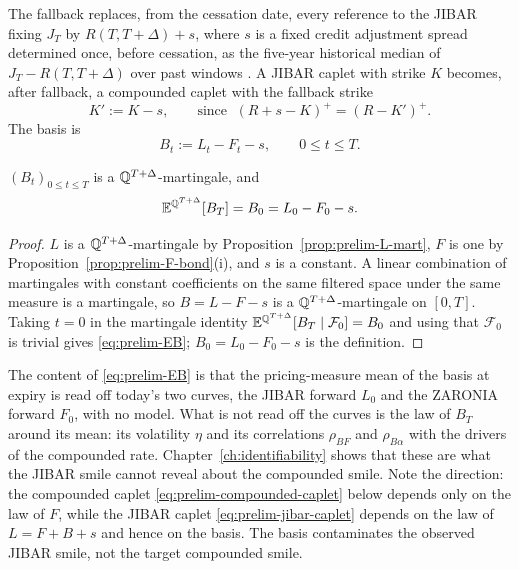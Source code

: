 \documentclass[../../../main.tex]{subfiles}
\begin{document}
\begin{definition}\label{def:prelim-fallback}
The fallback replaces, from the cessation date, every reference to the JIBAR fixing $J_T$ by $R(T,T+\Delta)+s$, where $s$ is a fixed credit adjustment spread determined once, before cessation, as the five-year historical median of $J_T-R(T,T+\Delta)$ over past windows \cite{sarb2025fallback,isda2025}. A JIBAR caplet with strike $K$ becomes, after fallback, a compounded caplet with the fallback strike
\[
K':=K-s,\qquad\text{since }\;(R+s-K)^+=(R-K')^+ .
\]
The basis is
\begin{equation}\label{eq:prelim-basis}
B_t:=L_t-F_t-s,\qquad 0\le t\le T .
\end{equation}
\end{definition}


\begin{proposition}\label{prop:prelim-B-mart}
$(B_t)_{0\le t\le T}$ is a $\mathbb{Q}^{T+\Delta}$-martingale, and
\begin{equation}\label{eq:prelim-EB}
\mathbb{E}^{\mathbb{Q}^{T+\Delta}}[B_T]=B_0=L_0-F_0-s .
\end{equation}
\end{proposition}

\begin{proof}
$L$ is a $\mathbb{Q}^{T+\Delta}$-martingale by Proposition~\ref{prop:prelim-L-mart}, $F$ is one by Proposition~\ref{prop:prelim-F-bond}(i), and $s$ is a constant. A linear combination of martingales with constant coefficients on the same filtered space under the same measure is a martingale, so $B=L-F-s$ is a $\mathbb{Q}^{T+\Delta}$-martingale on $[0,T]$. Taking $t=0$ in the martingale identity $\mathbb{E}^{\mathbb{Q}^{T+\Delta}}[B_T\mid\mathcal F_0]=B_0$ and using that $\mathcal F_0$ is trivial gives \eqref{eq:prelim-EB}; $B_0=L_0-F_0-s$ is the definition.
\end{proof}

The content of \eqref{eq:prelim-EB} is that the pricing-measure mean of the basis at expiry is read off today's two curves, the JIBAR forward $L_0$ and the ZARONIA forward $F_0$, with no model. What is not read off the curves is the law of $B_T$ around its mean: its volatility $\eta$ and its correlations $\rho_{BF}$ and $\rho_{B\alpha}$ with the drivers of the compounded rate. Chapter~\ref{ch:identifiability} shows that these are what the JIBAR smile cannot reveal about the compounded smile. Note the direction: the compounded caplet \eqref{eq:prelim-compounded-caplet} below depends only on the law of $F$, while the JIBAR caplet \eqref{eq:prelim-jibar-caplet} depends on the law of $L=F+B+s$ and hence on the basis. The basis contaminates the observed JIBAR smile, not the target compounded smile.
\end{document}
